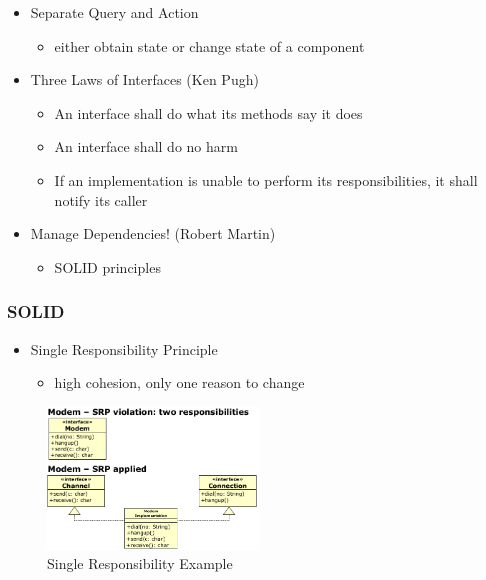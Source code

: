 \begin{itemize}
\tightlist
\item
  Separate Query and Action

  \begin{itemize}
  \tightlist
  \item
    either obtain state or change state of a component
  \end{itemize}
\item
  Three Laws of Interfaces (Ken Pugh)

  \begin{itemize}
  \tightlist
  \item
    An interface shall do what its methods say it does
  \item
    An interface shall do no harm
  \item
    If an implementation is unable to perform its responsibilities, it
    shall notify its caller
  \end{itemize}
\item
  Manage Dependencies! (Robert Martin)

  \begin{itemize}
  \tightlist
  \item
    SOLID principles
  \end{itemize}
\end{itemize}

\hypertarget{solid}{%
\subsubsection{SOLID}\label{solid}}

\begin{itemize}
\tightlist
\item
  Single Responsibility Principle

  \begin{itemize}
  \tightlist
  \item
    high cohesion, only one reason to change
  \end{itemize}
\end{itemize}

\begin{figure}[H]
\centering
\includegraphics[width=0.5\textwidth]{figures/singleresponsibility.png}
\caption{Single Responsibility Example}
\end{figure}


